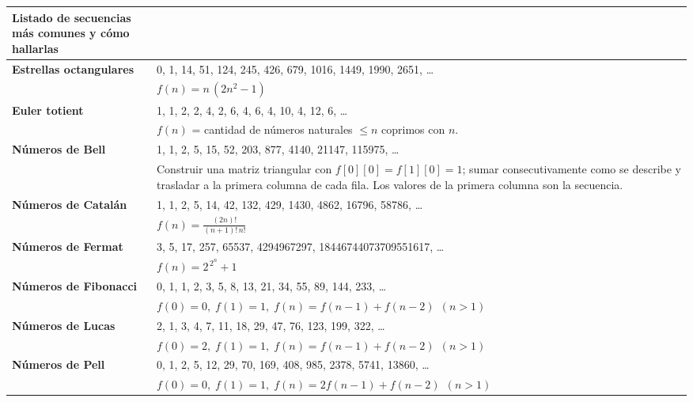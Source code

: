 \begin{center}
{\renewcommand{\arraystretch}{1.4}
\begin{tabular}{|p{}|p{}|}
\hline

\textbf{Listado de secuencias más comunes y cómo hallarlas} &
\\ \hline

\textbf{Estrellas octangulares} &
0, 1, 14, 51, 124, 245, 426, 679, 1016, 1449, 1990, 2651, \dots \\ \cline{2-2}
& $f(n)=n\,(2n^{2}-1)$ \\ \hline

\textbf{Euler totient} &
1, 1, 2, 2, 4, 2, 6, 4, 6, 4, 10, 4, 12, 6, \dots \\ \cline{2-2}
& $f(n)$ = cantidad de números naturales $\le n$ coprimos con $n$. \\ \hline

\textbf{Números de Bell} &
1, 1, 2, 5, 15, 52, 203, 877, 4140, 21147, 115975, \dots \\ \cline{2-2}
& Construir una matriz triangular con $f[0][0]=f[1][0]=1$; sumar consecutivamente como se describe y trasladar a la primera columna de cada fila. Los valores de la primera columna son la secuencia. \\ \hline

\textbf{Números de Catalán} &
1, 1, 2, 5, 14, 42, 132, 429, 1430, 4862, 16796, 58786, \dots \\ \cline{2-2}
& $f(n)=\displaystyle\frac{(2n)!}{(n+1)!\,n!}$ \\ \hline

\textbf{Números de Fermat} &
3, 5, 17, 257, 65537, 4294967297, 18446744073709551617, \dots \\ \cline{2-2}
& $f(n)=2^{\,2^{n}}+1$ \\ \hline

\textbf{Números de Fibonacci} &
0, 1, 1, 2, 3, 5, 8, 13, 21, 34, 55, 89, 144, 233, \dots \\ \cline{2-2}
& $f(0)=0,\; f(1)=1,\; f(n)=f(n-1)+f(n-2)\ \ (n>1)$ \\ \hline

\textbf{Números de Lucas} &
2, 1, 3, 4, 7, 11, 18, 29, 47, 76, 123, 199, 322, \dots \\ \cline{2-2}
& $f(0)=2,\; f(1)=1,\; f(n)=f(n-1)+f(n-2)\ \ (n>1)$ \\ \hline

\textbf{Números de Pell} &
0, 1, 2, 5, 12, 29, 70, 169, 408, 985, 2378, 5741, 13860, \dots \\ \cline{2-2}
& $f(0)=0,\; f(1)=1,\; f(n)=2f(n-1)+f(n-2)\ \ (n>1)$ \\ \hline


\end{tabular}}
\end{center}
